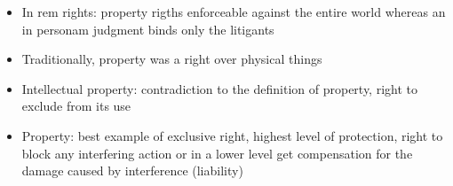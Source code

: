 \documentclass{article}
\begin{document}
\begin{itemize}
\item In rem rights: property rigths enforceable against the entire world whereas an in personam judgment binds only the litigants 
\item Traditionally, property was a right over physical things 
\item Intellectual property: contradiction to the definition of property, right to exclude from its use 
\item Property: best example of exclusive right, highest level of protection, right to block any interfering action or in a lower level get compensation for the damage caused by interference (liability)
\end{itemize}
\end{document}
